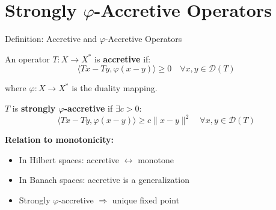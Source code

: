 \documentclass[aspectratio=169,10pt]{beamer}
\begin{document}

\section{Strongly $\varphi$-Accretive Operators}

\begin{frame}{Definition: Accretive and $\varphi$-Accretive Operators}

\begin{definition}
An operator $T : X \to X^*$ is \textbf{accretive} if:
$$\langle Tx - Ty, \varphi(x - y) \rangle \geq 0 \quad \forall x, y \in \mathcal{D}(T)$$

where $\varphi : X \to X^*$ is the duality mapping.
\end{definition}

\vspace{0.2cm}

\begin{definition}
$T$ is \textbf{strongly $\varphi$-accretive} if $\exists c > 0$:
$$\langle Tx - Ty, \varphi(x - y) \rangle \geq c \|x - y\|^2 \quad \forall x, y \in \mathcal{D}(T)$$
\end{definition}

\vspace{0.3cm}

\textbf{Relation to monotonicity:}
\begin{itemize}
\item In Hilbert spaces: accretive $\leftrightarrow$ monotone
\item In Banach spaces: accretive is a generalization
\item Strongly $\varphi$-accretive $\Rightarrow$ unique fixed point
\end{itemize}

\end{frame}
\end{document}
